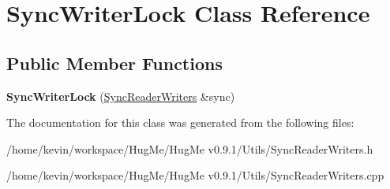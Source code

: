 \hypertarget{classSyncWriterLock}{
\section{SyncWriterLock Class Reference}
\label{classSyncWriterLock}
}
\subsection*{Public Member Functions}
\begin{DoxyCompactItemize}
\item 
\hypertarget{classSyncWriterLock_a9a25cfa20a0919f7d7ee670115d09317}{
{\bfseries SyncWriterLock} (\hyperlink{classSyncReaderWriters}{SyncReaderWriters} \&sync)}
\label{classSyncWriterLock_a9a25cfa20a0919f7d7ee670115d09317}

\end{DoxyCompactItemize}


The documentation for this class was generated from the following files:\begin{DoxyCompactItemize}
\item 
/home/kevin/workspace/HugMe/HugMe v0.9.1/Utils/SyncReaderWriters.h\item 
/home/kevin/workspace/HugMe/HugMe v0.9.1/Utils/SyncReaderWriters.cpp\end{DoxyCompactItemize}

